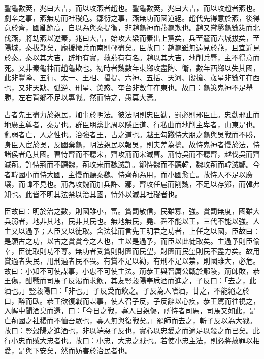 
\begin{pinyinscope}
鑿龜數筴，兆曰大吉，而以攻燕者趙也。鑿龜數筴，兆曰大吉，而以攻趙者燕也。劇辛之事，燕無功而社稷危。鄒衍之事，燕無功而國道絕。趙代先得意於燕，後得意於齊，國亂節高，自以為與秦提衡，非趙龜神而燕龜欺也。趙又嘗鑿龜數筴而北伐燕，將劫燕以逆秦，兆曰大吉，始攻大梁而秦出上黨矣，兵至釐而六城拔矣，至陽城，秦拔鄴矣，龐援揄兵而南則鄣盡矣。臣故曰：趙龜雖無遠見於燕，且宜近見於秦。秦以其大吉，辟地有實，救燕有有名。趙以其大吉，地削兵辱，主不得意而死。又非秦龜神而趙龜欺也。初時者魏數年東鄉攻盡陶、衛，數年西鄉以失其國，此非豐隆、五行、太一、王相、攝提、六神、五括、天河、殷搶、歲星非數年在西也，又非天缺、弧逆、刑星、熒惑、奎台非數年在東也。故曰：龜筴鬼神不足舉勝，左右背鄉不足以專戰。然而恃之，愚莫大焉。

古者先王盡力於親民，加事於明法。彼法明則忠臣勸，罰必則邪臣止。忠勸邪止而地廣主尊者，秦是也。群臣朋黨比周以隱正道、行私曲而地削主卑者，山東是也。亂弱者亡，人之性也。治強者王，古之道也。越王勾踐恃大朋之龜與吳戰而不勝，身臣入宦於吳，反國棄龜，明法親民以報吳，則夫差為擒。故恃鬼神者慢於法，恃諸侯者危其國。曹恃齊而不聽宋，齊攻荊而宋滅曹。荊恃吳而不聽齊，越伐吳而齊滅荊。許恃荊而不聽魏，荊攻宋而魏滅許。鄭恃魏而不聽韓，魏攻荊而韓滅鄭。今者韓國小而恃大國，主慢而聽秦魏、恃齊荊為用，而小國愈亡。故恃人不足以廣壤，而韓不見也。荊為攻魏而加兵許、鄢，齊攻任扈而削魏，不足以存鄭，而韓弗知也。此皆不明其法禁以治其國，恃外以滅其社稷者也。

臣故曰：明於治之數，則國雖小，富。賞罰敬信，民雖寡，強。賞罰無度，國雖大兵弱者，地非其地，民非其民也。無地無民，堯、舜不能以王，三代不能以強。人主又以過予；人臣又以徒取。舍法律而言先王明君之功者，上任之以國，臣故曰：是願古之功，以古之賞賞今之人也，主以是過予，而臣以此徒取矣。主過予則臣偷幸，臣徒取則功不尊。無功者受賞則財匱而民望，財匱而民望則民不盡力矣。故用賞過者失民，用刑過者民不畏。有賞不足以勸，有刑不足以禁，則國雖大，必危。故曰：小知不可使謀事，小忠不可使主法。荊恭王與晉厲公戰於鄢陵，荊師敗，恭王傷，酣戰而司馬子反渴而求飲，其友豎穀陽奉卮酒而進之，子反曰：「去之，此酒也。」豎穀陽曰：「非也。」子反受而飲之。子反為人嗜酒，甘之，不能絕之於口，醉而臥。恭王欲復戰而謀事，使人召子反，子反辭以心疾，恭王駕而往視之，入幄中聞酒臭而還，曰：「今日之戰，寡人目親傷，所恃者司馬，司馬又如此，是亡荊國之社稷而不恤吾眾也，寡人無與復戰矣。」罷師而去之，斬子反以為大戮。故曰：豎穀陽之進酒也，非以端惡子反也，實心以忠愛之而適足以殺之而已矣。此行小忠而賊大忠者也。故曰：小忠，大忠之賊也。若使小忠主法，則必將赦罪以相愛，是與下安矣，然而妨害於治民者也。


\end{pinyinscope}
